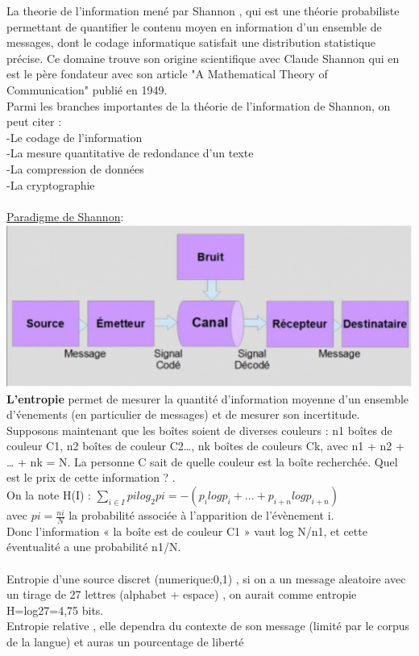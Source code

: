 \documentclass[a4paper,8pt,openany]{book}
\begin{document}
La theorie de l'information men\'e par Shannon , qui est une théorie probabiliste permettant de quantifier le contenu moyen en information d'un ensemble de messages, dont le codage informatique satisfait une distribution statistique précise. Ce domaine trouve son origine scientifique avec Claude Shannon qui en est le père fondateur avec son article "A Mathematical Theory of Communication" publié en 1949.\\
Parmi les branches importantes de la théorie de l'information de Shannon, on peut citer :\\
-Le codage de l'information\\
-La mesure quantitative de redondance d'un texte\\
-La compression de données\\
-La cryptographie\\
\\
\underline{Paradigme de Shannon}:\\
\includegraphics[width=0.75\linewidth,center]{img/modele_com_shannon.jpg}
\\
\textbf{L'entropie} permet de mesurer la quantit\'e d'information moyenne d'un ensemble d'\'venements (en particulier de messages) et de mesurer son incertitude.\\
Supposons maintenant que les boîtes soient de diverses couleurs : n1 boîtes de couleur C1, n2 boîtes de couleur C2…, nk boîtes de couleurs Ck, avec n1 + n2 + … + nk = N. La personne C sait de quelle couleur est la boîte recherchée. Quel est le prix de cette information ? .\\
On la note H(I) : $\sum_{i\in I} pi log_2 pi = -(p_i log p_i +...+ p_{i+n} log p_{i+n})$ \\
avec $pi=\frac{ni}{N}$ la probabilité associée à l'apparition de l'évènement i. \\
Donc l'information « la boîte est de couleur C1 » vaut log N/n1, et cette éventualité a une probabilité n1/N.\\
\\
Entropie d'une source discret (numerique:0,1) , si on a un message aleatoire avec un tirage de 27 lettres (alphabet + espace) , on aurait comme entropie H=log27=4,75 bits.\\
Entropie relative , elle dependra du contexte de son message (limit\'e par le corpus de la langue) et auras un pourcentage de libert\'e
\end{document}
